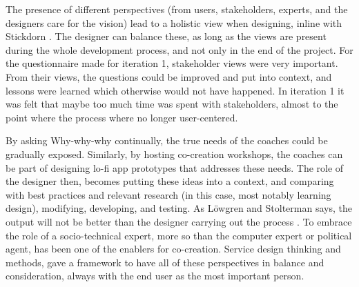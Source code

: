   The presence of different perspectives (from users, stakeholders, experts, and the designers care for the vision) lead to a holistic view when designing, inline with Stickdorn \cite{stickdorn}. The designer can balance these, as long as the views are present during the whole development process, and not only in the end of the project. For the questionnaire made for iteration 1, stakeholder views were very important. From their views, the questions could be improved and put into context, and lessons were learned which otherwise would not have happened. In iteration 1 it was felt that maybe too much time was spent with stakeholders, almost to the point where the process where no longer user-centered.

  By asking Why-why-why continually, the true needs of the coaches could be gradually exposed. Similarly, by hosting co-creation workshops, the coaches can be part of designing lo-fi app prototypes that addresses these needs. The role of the designer then, becomes putting these ideas into a context, and comparing with best practices and relevant research (in this case, most notably learning design), modifying, developing, and testing. As Löwgren and Stolterman says, the output will not be better than the designer carrying out the process \cite{lowgren}. To embrace the role of a socio-technical expert, more so than the computer expert or political agent, has been one of the enablers for co-creation. Service design thinking and methods, gave a framework to have all of these perspectives in balance and consideration, always with the end user as the most important person.













